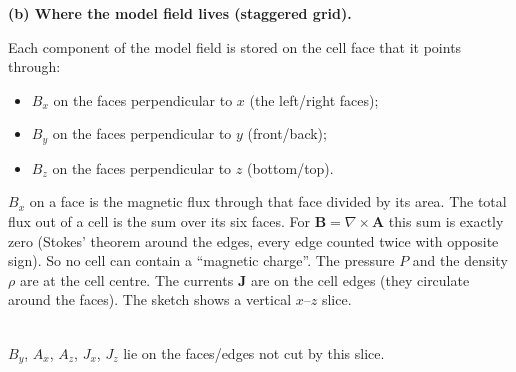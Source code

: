 \documentclass[10pt]{extarticle}
\newcommand{\B}{\mathbf B}\newcommand{\J}{\mathbf J}\newcommand{\Bo}{\mathbf B_{\rm obs}}
\begin{document}
\textbf{(b) Where the model field lives (staggered grid).}\par\noindent
\begin{minipage}[t]{0.56\linewidth}\vspace{0pt}
Each component of the model field is stored on the cell face that it points through:
\begin{itemize}
\item $B_x$ on the faces perpendicular to $x$ (the left/right faces);
\item $B_y$ on the faces perpendicular to $y$ (front/back);
\item $B_z$ on the faces perpendicular to $z$ (bottom/top).
\end{itemize}
$B_x$ on a face is the magnetic flux through that face divided by its area. The total flux out of a cell is the sum over its six faces. For $\B=\nabla\times\mathbf A$ this sum is exactly zero (Stokes' theorem around the edges, every edge counted twice with opposite sign). So no cell can contain a ``magnetic charge''. The pressure $P$ and the density $\rho$ are at the cell centre. The currents $\J$ are on the cell edges (they circulate around the faces). The sketch shows a vertical $x$--$z$ slice.
\end{minipage}\hfill
\begin{minipage}[t]{0.40\linewidth}\vspace{0pt}\centering
{}\\[-2pt]
{\scriptsize $B_y$, $A_x$, $A_z$, $J_x$, $J_z$ lie on the faces/edges not cut by this slice.}
\end{minipage}
\end{document}
